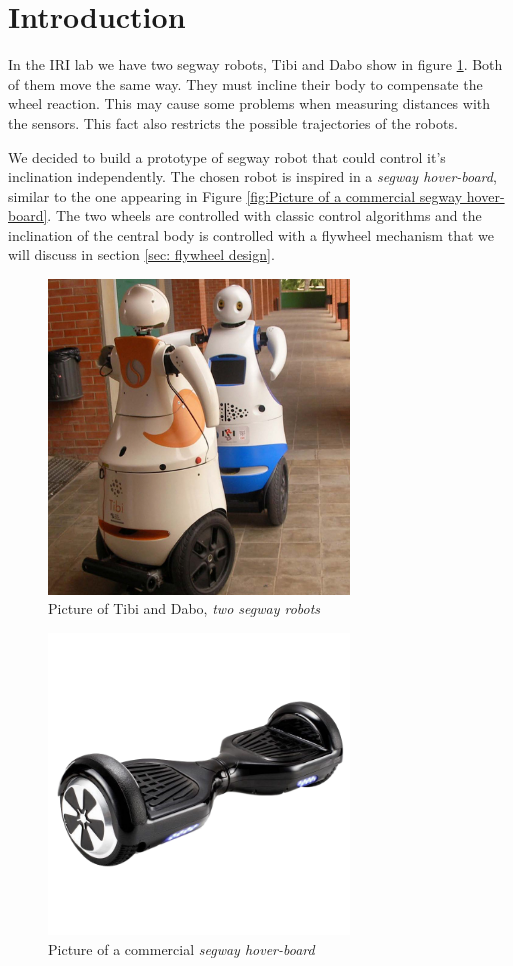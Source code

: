 \section{Introduction}
In the IRI lab we have two segway robots, Tibi and Dabo show in figure
\ref{fig:Picture of Tibi and Dabo}. Both of them move the same way.
They must incline their body to compensate the wheel reaction. 
This may cause some problems when measuring distances with the sensors.
This fact also restricts the possible trajectories of the robots. 

We decided to build a prototype of segway robot that could control it's
inclination independently. The chosen robot is inspired in a \textit{segway hover-board}, 
similar to the one appearing in Figure \ref{fig:Picture of a commercial 
segway hover-board}. The two wheels are controlled with classic
control algorithms and the inclination of the central body is
controlled with a flywheel mechanism that we will discuss in section \ref{sec: flywheel design}.

\begin{figure}
	\centering
	\includegraphics[width=8cm]{img/robots-TIBI-i-DABO-IRI-red.jpg}
	\caption{Picture of Tibi and Dabo, \textit{two segway robots} }
	\label{fig:Picture of Tibi and Dabo}
\end{figure}

\begin{figure}
	\centering
	\includegraphics[width=8cm]{img/segway_hoverboard_picture.png}
	\caption{Picture of a commercial \textit{segway hover-board} }
	\label{fig:Picture of a commercial segway hover-board}
\end{figure}

